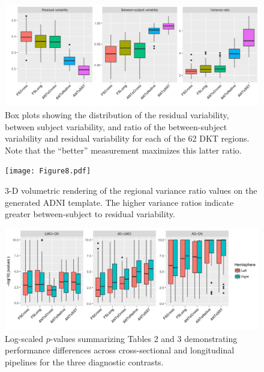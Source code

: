 \documentclass[11pt,table]{article}
\begin{document}
\clearpage
\newpage

\begin{figure}
\centering
\includegraphics[width=\textwidth]{Figure7.pdf}
\caption{Box plots showing the distribution of the residual variability,
between subject variability, and ratio of the between-subject variability and
residual variability for each of the 62 DKT regions.  Note that the
``better'' measurement maximizes this latter ratio.}
\label{fig:variance_boxplots}
\end{figure}

\newpage

\begin{figure}
\centering
\texttt{[image: Figure8.pdf]}
\caption{3-D volumetric rendering of the regional variance ratio values on the generated ADNI template.
The higher variance ratios indicate greater between-subject to residual variability.}
\label{fig:brain_variance}
\end{figure}

\newpage

\begin{figure}
\centering
\includegraphics[width=1.0\textwidth]{Figure9.pdf}
\caption{
Log-scaled $p$-values summarizing Tables 2 and 3 demonstrating performance differences
across cross-sectional and longitudinal pipelines for the three diagnostic contrasts.
}
\label{fig:logpvalues}
\end{figure}

\newpage



\newpage



\newpage



\newpage
\end{document}
